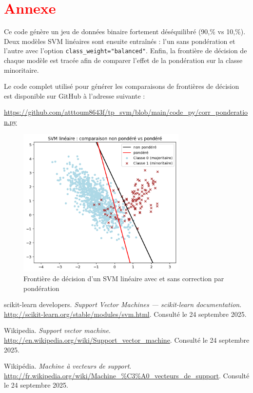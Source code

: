 \documentclass[
  12pt,
]{article}
\begin{document}
\newpage

\section{\texorpdfstring{\textcolor{red}{Annexe}}{}}\label{section-7}

Ce code génère un jeu de données binaire fortement déséquilibré (90,\%
vs 10,\%). Deux modèles SVM linéaires sont ensuite entraînés : l'un sans
pondération et l'autre avec l'option \texttt{class\_weight="balanced"}.
Enfin, la frontière de décision de chaque modèle est tracée afin de
comparer l'effet de la pondération sur la classe minoritaire.

Le code complet utilisé pour générer les comparaisons de frontières de
décision est disponible sur GitHub à l'adresse suivante :

\textcolor{blue}{\url{https://github.com/atttoum8643f/tp_svm/blob/main/code_py/corr_ponderation.py}}

\begin{figure}[H]
    \centering
    \includegraphics[width=0.75\textwidth]{vis/pond.png}
    \caption{Frontière de décision d’un SVM linéaire avec et sans correction par pondération}
    \label{fig:avec_sans_pondération}
\end{figure}

\begin{thebibliography}{9}

scikit-learn developers.  
\textit{Support Vector Machines — scikit-learn documentation}.  
\url{http://scikit-learn.org/stable/modules/svm.html}.  
Consulté le 24 septembre 2025.

Wikipedia.  
\textit{Support vector machine}.  
\url{http://en.wikipedia.org/wiki/Support_vector_machine}.  
Consulté le 24 septembre 2025.

Wikipédia.  
\textit{Machine à vecteurs de support}.  
\url{http://fr.wikipedia.org/wiki/Machine_%C3%A0_vecteurs_de_support}.  %
Consulté le 24 septembre 2025.

\end{thebibliography}
\end{document}
